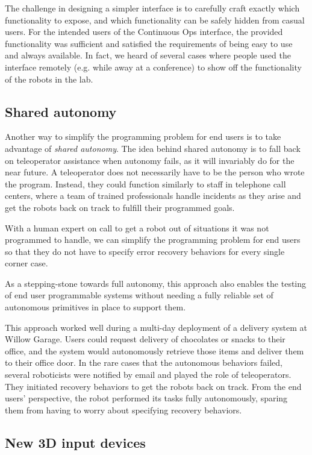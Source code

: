 \documentclass[10pt,twocolumn]{article}
\begin{document}
The challenge in designing a simpler interface is to carefully craft exactly which functionality to expose, and which functionality can be safely hidden from casual users.  For the intended users of the Continuous Ops interface, the provided functionality was sufficient and satisfied the requirements of being easy to use and always available. In fact, we heard of several cases where people used the interface remotely (e.g. while away at a conference) to show off the functionality of the robots in the lab.

\subsection{Shared autonomy}

Another way to simplify the programming problem for end users is to take advantage of {\em shared autonomy}. The idea behind shared autonomy is to fall back on teleoperator assistance when autonomy fails, as it will invariably do for the near future. A teleoperator does not necessarily have to be the person who wrote the program. Instead, they could function similarly to staff in telephone call centers, where a team of trained professionals handle incidents as they arise and get the robots back on track to fulfill their programmed goals.

With a human expert on call to get a robot out of situations it was not programmed to handle, we can simplify the programming problem for end users so that they do not have to specify error recovery behaviors for every single corner case.

As a stepping-stone towards full autonomy, this approach also enables the testing of end user programmable systems without needing a fully reliable set of autonomous primitives in place to support them.

This approach worked well during a multi-day deployment of a delivery system at Willow Garage. Users could request delivery of chocolates or snacks to their office, and the system would autonomously retrieve those items and deliver them to their office door. In the rare cases that the autonomous behaviors failed, several roboticists were notified by email and played the role of teleoperators. They initiated recovery behaviors to get the robots back on track. From the end users' perspective, the robot performed its tasks fully autonomously, sparing them from having to worry about specifying recovery behaviors.

\subsection{New 3D input devices}
\end{document}

